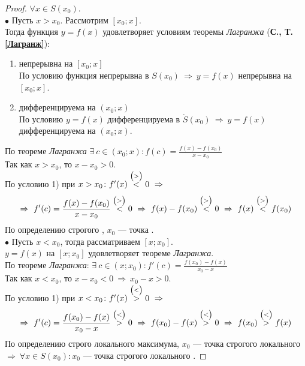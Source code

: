 \begin{proof}
	$\forall x \in S(x_0)$.\\
	$\bullet$ Пусть $x > x_0$. Рассмотрим $[x_0; x]$. \\
	Тогда функция $y=f(x)$ удовлетворяет условиям теоремы \textit{Лагранжа} (\textbf{С.\pageref{Лагранж}, Т.\ref{Лагранж}}):
	\begin{enumerate}
		\item непрерывна на $[x_0; x]$\\
		      По условию функция непрерывна в $S(x_0)\ \Rightarrow\ y=f(x)$ непрерывна на $[x_0; x]$.
		\item дифференцируема на $(x_0; x)$\\
		      По условию $y=f(x)$ дифференцируема в $\mathring{S}(x_0)\ \Rightarrow\ y=f(x)$ дифференцируема на $(x_0; x)$.
	\end{enumerate}
	По теореме \textit{Лагранжа} $\displaystyle \exists\ c \in (x_0; x)\colon f(c) = \frac{f(x) - f(x_0)}{x - x_0}$\\
	Так как $x > x_0$, то $x - x_0 > 0$.\\
	По условию 1) при $x > x_0\colon f'(x) \overset{\scriptsize{\big(>\big)}}{<} 0\ \Rightarrow$
	\begin{gather*}
		\Rightarrow\ f'(c) = \frac{f(x) - f(x_0)}{x - x_0} \overset{\scriptsize{\big(>\big)}}{<} 0\ \Rightarrow\ f(x) - f(x_0) \overset{\scriptsize{\big(>\big)}}{<} 0\ \Rightarrow\ f(x) \overset{\scriptsize{\big(>\big)}}{<} f(x_0)
	\end{gather*}
	По определению строгого , $x_0$ --- точка .\\
	$\bullet$ Пусть $x<x_0$, тогда рассматриваем $[x; x_0]$.\\
	$y=f(x)$ на $[x; x_0]$ удовлетворяет теореме \textit{Лагранжа}.\\[1ex]
	По теореме \textit{Лагранжа}: $\displaystyle \exists\ c \in (x; x_0)\colon f'(c) = \frac{f(x_0) - f(x)}{x_0 - x}$\\[1ex]
	Так как $x < x_0$, то $x - x_0 < 0\ \Rightarrow\ x_0-x > 0$.\\
	По условию 1) при $x < x_0\colon f'(x) \overset{\scriptsize{\big(<\big)}}{>} 0\ \Rightarrow$
	\begin{gather*}
		\Rightarrow\ f'(c) = \frac{f(x_0) - f(x)}{x_0 - x} \overset{\scriptsize{\big(<\big)}}{>} 0\ \Rightarrow\ f(x_0) - f(x) \overset{\scriptsize{\big(<\big)}}{>} 0\ \Rightarrow\ f(x_0) \overset{\scriptsize{\big(<\big)}}{>} f(x)
	\end{gather*}
	По определению строго локального максимума, $x_0$ --- точка строгого локального\\[1ex]
	 $\Rightarrow\ \forall x \in S(x_0)\colon x_0$ --- точка строгого локального .
\end{proof} \vspace{-11pt}

